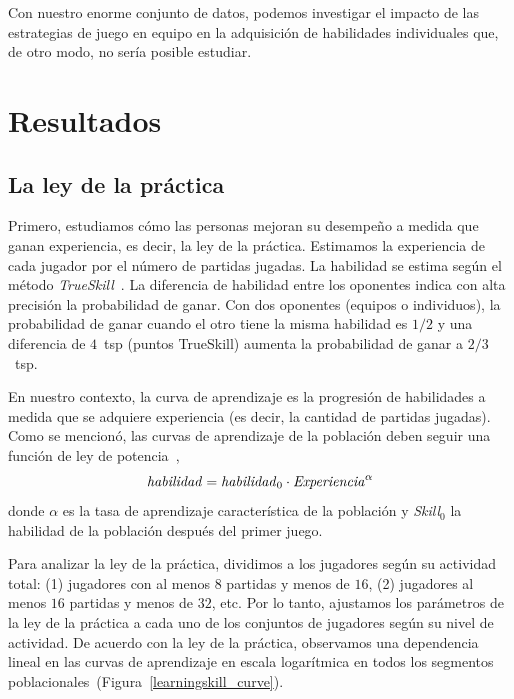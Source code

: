 \documentclass[a4paper,11pt]{book}
\theoremstyle{definition}
\begin{document}
Con nuestro enorme conjunto de datos, podemos investigar el impacto de las estrategias de juego en equipo en la adquisición de habilidades individuales que, de otro modo, no sería posible estudiar.

\section{Resultados}

\subsection{La ley de la práctica}

Primero, estudiamos cómo las personas mejoran su desempeño a medida que ganan experiencia, es decir, la ley de la práctica.
%
Estimamos la experiencia de cada jugador por el número de partidas jugadas.
%
La habilidad se estima según el método \emph{TrueSkill}~\cite{Herbrich2007}.
%
La diferencia de habilidad entre los oponentes indica con alta precisión la probabilidad de ganar.
%
Con dos oponentes (equipos o individuos), la probabilidad de ganar cuando el otro tiene la misma habilidad es $1/2$ y una diferencia de $4$~tsp (puntos TrueSkill) aumenta la probabilidad de ganar a $2/3$~tsp.


En nuestro contexto, la curva de aprendizaje es la progresión de habilidades a medida que se adquiere experiencia (es decir, la cantidad de partidas jugadas).
%
Como se mencionó, las curvas de aprendizaje de la población deben seguir una función de ley de potencia~\cite{Newell1981},
%
\begin{equation}\label{lawOfPractice}
   \text{\emph{habilidad}} = \text{\emph{habilidad}}_0 \cdot \text{\emph{Experiencia}}^{\alpha}
\end{equation}
%
donde $\alpha$ es la tasa de aprendizaje característica de la población y \emph{Skill}$_0$ la habilidad de la población después del primer juego.


Para analizar la ley de la práctica, dividimos a los jugadores según su actividad total: (1) jugadores con al menos $8$ partidas y menos de $16$, (2) jugadores al menos $16$ partidas y menos de $32$, etc.
%
Por lo tanto, ajustamos los parámetros de la ley de la práctica a cada uno de los conjuntos de jugadores según su nivel de actividad.
%
De acuerdo con la ley de la práctica, observamos una dependencia lineal en las curvas de aprendizaje en escala logarítmica en todos los segmentos poblacionales~(Figura~\ref{learningskill_curve}).
\end{document}
